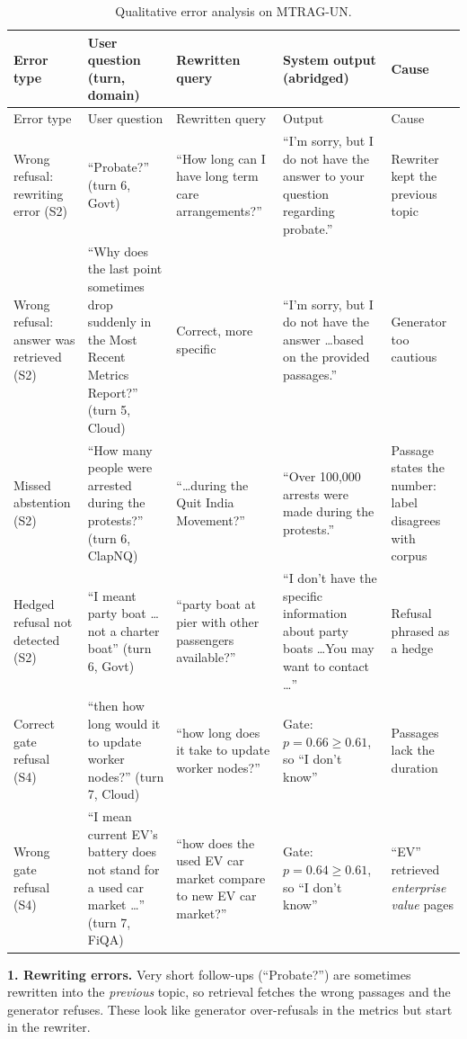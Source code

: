\documentclass[11pt,a4paper]{report}
\newcommand{\sys}[1]{\textsf{#1}}
\begin{document}
{\small
\begin{longtable}{@{}p{2.2cm}p{3.4cm}p{3.1cm}p{3.2cm}p{2.2cm}@{}}
\caption{Qualitative error analysis on MTRAG-UN.}\label{tab:errors}\\
\toprule
Error type & User question (turn, domain) & Rewritten query & System output (abridged) & Cause \\
\midrule
\endfirsthead
\toprule
Error type & User question & Rewritten query & Output & Cause \\
\midrule
\endhead
Wrong refusal: rewriting error (\sys{S2}) & ``Probate?'' (turn 6, Govt) & ``How long can I have long term care arrangements?'' & ``I'm sorry, but I do not have the answer to your question regarding probate.'' & Rewriter kept the previous topic \\
\midrule
Wrong refusal: answer was retrieved (\sys{S2}) & ``Why does the last point sometimes drop suddenly in the Most Recent Metrics Report?'' (turn 5, Cloud) & Correct, more specific & ``I'm sorry, but I do not have the answer \ldots based on the provided passages.'' & Generator too cautious \\
\midrule
Missed abstention (\sys{S2}) & ``How many people were arrested during the protests?'' (turn 6, ClapNQ) & ``\ldots during the Quit India Movement?'' & ``Over 100,000 arrests were made during the protests.'' & Passage states the number: label disagrees with corpus \\
\midrule
Hedged refusal not detected (\sys{S2}) & ``I meant party boat \ldots not a charter boat'' (turn 6, Govt) & ``party boat at pier with other passengers available?'' & ``I don't have the specific information about party boats \ldots You may want to contact \ldots'' & Refusal phrased as a hedge \\
\midrule
Correct gate refusal (\sys{S4}) & ``then how long would it to update worker nodes?'' (turn 7, Cloud) & ``how long does it take to update worker nodes?'' & Gate: $p=0.66 \ge 0.61$, so ``I don't know'' & Passages lack the duration \\
\midrule
Wrong gate refusal (\sys{S4}) & ``I mean current EV's battery does not stand for a used car market \ldots'' (turn 7, FiQA) & ``how does the used EV car market compare to new EV car market?'' & Gate: $p=0.64 \ge 0.61$, so ``I don't know'' & ``EV'' retrieved \emph{enterprise value} pages \\
\bottomrule
\end{longtable}}

\textbf{1. Rewriting errors.} Very short follow-ups (``Probate?'') are sometimes rewritten into the \emph{previous} topic, so retrieval fetches the wrong passages and the generator refuses. These look like generator over-refusals in the metrics but start in the rewriter.
\end{document}
